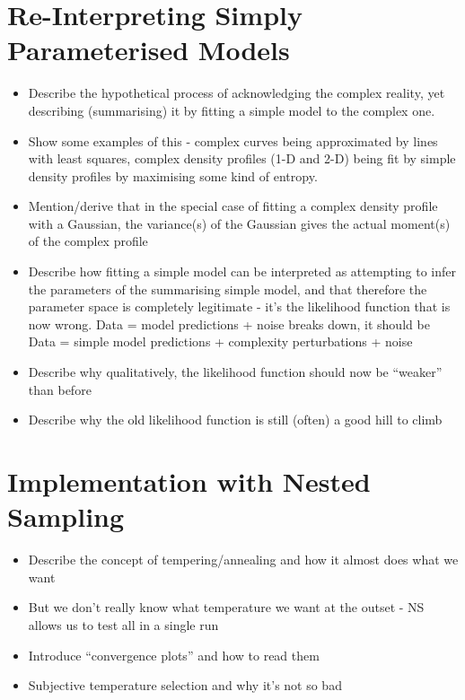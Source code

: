 \documentclass[letterpaper, 11pt]{article}
\begin{document}
\section{Re-Interpreting Simply Parameterised Models}

\begin{itemize}
\item Describe the hypothetical process of acknowledging the complex reality, yet describing (summarising) it by fitting a simple model to the complex one. \\
\item Show some examples of this - complex curves being approximated by lines with least squares, complex density profiles (1-D and 2-D) being fit by simple density profiles by maximising some kind of entropy.
\item Mention/derive that in the special case of fitting a complex density profile with a Gaussian, the variance(s) of the Gaussian gives the actual moment(s) of the complex profile
\item Describe how fitting a simple model can be interpreted as attempting to infer the parameters of the summarising simple model, and that therefore the parameter space is completely legitimate - it's the likelihood function that is now wrong. Data = model predictions + noise breaks down, it should be Data = simple model predictions + complexity perturbations + noise
\item Describe why qualitatively, the likelihood function should now be ``weaker'' than before
\item Describe why the old likelihood function is still (often) a good hill to climb
\end{itemize}

\section{Implementation with Nested Sampling}
\begin{itemize}
\item Describe the concept of tempering/annealing and how it almost does what we want \\
\item But we don't really know what temperature we want at the outset - NS allows us to test all in a single run
\item Introduce ``convergence plots'' and how to read them
\item Subjective temperature selection and why it's not so bad
\end{itemize}
\end{document}
